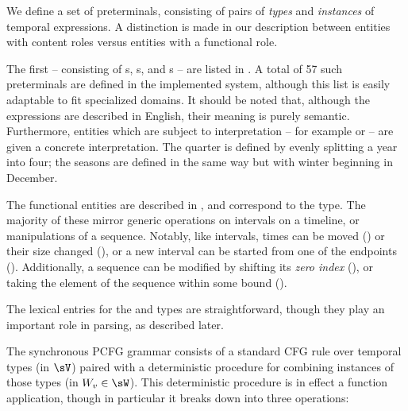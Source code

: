 We define a set of preterminals, consisting of pairs of 
	\textit{types} and \textit{instances}	of temporal expressions.
A distinction is made in our description between entities with 
	content roles versus entities with a functional role.

The first -- consisting of s, s, and s --
	are listed in .
A total of 57 such preterminals are defined in the implemented system,
	although this list is easily adaptable to fit specialized domains.
It should be noted that, although the expressions are described in English,
	their meaning is purely semantic.
Furthermore, entities which are subject to interpretation -- for example
	 or  -- are given a concrete interpretation.
The  quarter is defined by evenly splitting a year into four;
	the seasons are defined in the same way but with winter beginning in December.

The functional entities are described in , and correspond to
	the  type.
The majority of these mirror generic operations on intervals on a timeline,
	or manipulations of a sequence.
Notably, like intervals, times can be moved () or
	their size changed (), or
	a new interval can be started from one of the endpoints
	().
Additionally, a sequence can be modified by shifting its \textit{zero index}
	(), 
	or taking the  element of the sequence within some bound
	().

The lexical entries for the  and  types are straightforward,
	though they play an important role in parsing, as described later.


The synchronous PCFG grammar consists of a standard CFG rule over temporal
	types (in $\sV$) paired with a deterministic procedure for combining instances
	of those types (in $W_v \in \sW$).
This deterministic procedure is in effect a function application,
	though in particular it breaks down into three operations:

